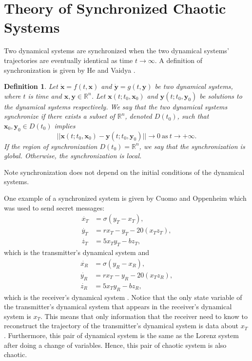 \documentclass[12pt]{article}
\newtheorem{definition}{Definition}[section]
\begin{document}
    \section{Theory of Synchronized Chaotic Systems}
      Two dynamical systems are synchronized when the two dynamical systems' trajectories are eventually identical as time $t \rightarrow \infty$. A definition of synchronization is given by He and Vaidya \cite{he_vaidya_1992}. 
      \begin{definition}
        Let $\dot{\mathbf{x}} = f(t,\mathbf{x})$ and $\dot{\mathbf{y}} = g(t,\mathbf{y})$ be two dynamical systems, where $t$ is time and $\mathbf{x},\mathbf{y} \in \mathbb{R}^n$. Let $\mathbf{x}(t;t_0,\mathbf{x}_0)$ and $\mathbf{y}(t;t_0,\mathbf{y}_0)$ be solutions to the dynamical systems respectively. We say that the two dynamical systems synchronize if there exists a subset of $\mathbb{R}^n$, denoted $D(t_0)$, such that $\mathbf{x}_0,\mathbf{y}_0 \in D(t_0)$ implies 
        \begin{equation*} 
          ||\mathbf{x}(t;t_0,\mathbf{x}_0) - \mathbf{y}(t;t_0,\mathbf{y}_0)|| \rightarrow 0 \ \text{as} \ t \rightarrow +\infty.
        \end{equation*}
        If the region of synchronization $D(t_0) = \mathbb{R}^n$, we say that the synchronization is global. Otherwise, the synchronization is local. 
      \end{definition}
      Note synchronization does not depend on the initial conditions of the dynamical systems. 
      
      One example of a synchronized system is given by Cuomo and Oppenheim which was used to send secret messages: 
      \begin{equation}\label{eq:transmitter}
      \begin{aligned}
        \dot{x_T} &= \sigma (y_T-x_T), \\
        \dot{y_T} &= r  x_T - y_T - 20 (x_T   z_T),\\
        \dot{z_T} &= 5 x_T y_T - b  z_T,
      \end{aligned}
    \end{equation} 
    which is the transmitter's dynamical system and 
    \begin{equation}\label{eq:receiver}
      \begin{aligned}
        \dot{x_R} &= \sigma (y_R-x_R), \\
        \dot{y_R} &= r  x_T - y_R - 20 (x_T   z_R),\\
        \dot{z_R} &= 5 x_T y_R - b  z_R,
      \end{aligned}
    \end{equation}
    which is the receiver's dynamical system \cite{cuomo1993}. Notice that the only state variable of the transmitter's dynamical system that appears in the receiver's dynamical system is $x_T$. This means that only information that the receiver need to know to reconstruct the trajectory of the transmitter's dynamical system is data about $x_T$. Furthermore, this pair of dynamical system is the same as the Lorenz system after doing a change of variables. Hence, this pair of chaotic system is also chaotic. 
\end{document}
